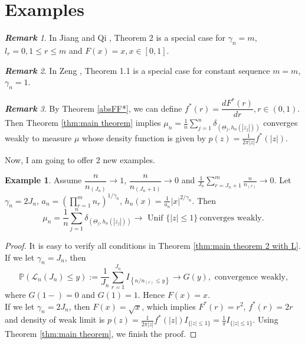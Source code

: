 \documentclass[12pt]{article}
\theoremstyle{plain}
\theoremstyle{definition}
\newtheorem{exm}{\textbf{Example}}
\theoremstyle{remark}
\newtheorem{rem}{\textbf{Remark}}
\begin{document}
\section{Examples}
\begin{rem}
	In Jiang and Qi \cite{JiangQi2019}, Theorem 2 is a special case for $\gamma_n=m$, $l_r=0, 1\leq r\leq m$ and $F(x)=x, x\in [0,1]$. 
\end{rem}
\begin{rem}
    In Zeng \cite{zeng2017}, Theorem 1.1 is a special case for constant sequence $m=m$,  $\gamma_{n}=1$.
 \end{rem}
 \begin{rem}
By Theorem \ref{absFF*}, we can define $f^*(r)=\dfrac{d F^*(r)}{dr}, r\in (0,1)$. Then Theorem \ref{thm:main theorem} implies $\mu_{n}=\frac{1}{n} \sum_{j=1}^{n} \delta_{\left(\Theta_{j}, h_{n}\left(\left|z_{j}\right|\right)\right)}$ converges weakly to measure $\mu$ whose density function is given by $p(z)=\frac{1}{2 \pi|z|} f^{*}(|z|)$. 
\end{rem}
Now, I am going to offer 2 new examples.
\begin{exm}
	Assume $\dfrac{n}{n_{(J_n)}}\rightarrow 1$, $\dfrac{n}{n_{(J_n+1)}}\rightarrow 0$ and $\frac{1}{J_{n}} \sum_{r=J_{n}+1}^{m} \frac{n}{n_{(r)}} \rightarrow 0$. Let $\gamma_{n}=2J_n$, $a_{n}=\left(\prod_{r=1}^{m}n_{r}\right)^{1 / \gamma_{n}}$, $h_{n}(x)=\frac{1}{a_{n}}|x|^{2 / \gamma_{n}}$. Then
	\begin{equation*}
	\mu_{n}=\frac{1}{n} \sum_{j=1}^{n} \delta_{\left(\Theta_{j}, h_{n}\left(\left|z_{j}\right|\right)\right)}\rightarrow \text { Unif }\{|z| \leq 1\}\ \text{converges weakly}.
	\end{equation*}
\end{exm}
\begin{proof}
    It is easy to verify all conditions in Theorem \ref{thm:main theorem 2 with L}. If we let $\gamma_{n}=J_n$, then 
    \begin{equation*}
    \mathbb{P}\left(\mathscr{L}_{n}\left(J_{n}\right) \leqslant y\right) :=\frac{1}{J_{n}} \sum_{r=1}^{J_{n}} I_{\left\{n / n_{(r)} \leqslant y\right\}} \rightarrow G(y), \text { convergence weakly,}
    \end{equation*}
    where $G(1-)=0$ and $G(1)=1$. Hence $F(x)=x$. \\
    If we let $\gamma_{n}=2J_n$, then $F(x)=\sqrt x$, which implies $F^*(r)=r^2$, $f^*(r)=2r$ and density of weak limit is $p(z)=\frac{1}{2 \pi|z|} f^{*}(|z|)I_{\{|z|\leq 1\}}=\frac{1}{\pi}I_{\{|z|\leq 1\}}$. Using Theorem \ref{thm:main theorem}, we finish the proof.
\end{proof}
\end{document}
